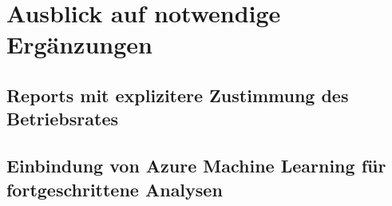\section{Ausblick auf notwendige Ergänzungen} \label{sec:praktischeUmsetzung:ausblick}

\subsection{Reports mit explizitere Zustimmung des Betriebsrates}

\subsection{Einbindung von Azure Machine Learning für fortgeschrittene Analysen}